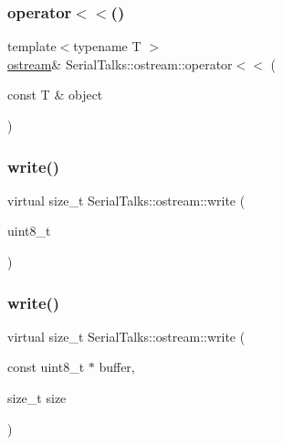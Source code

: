 \subsubsection{\texorpdfstring{operator$<$$<$()}{operator<<()}}
{\footnotesize\ttfamily template$<$typename T $>$ \\
\hyperlink{class_serial_talks_1_1ostream}{ostream}\& Serial\+Talks\+::ostream\+::operator$<$$<$ (\begin{DoxyParamCaption}\item[{const T \&}]{object }\end{DoxyParamCaption})\hspace{0.3cm}{\ttfamily [inline]}}

\mbox{\label{class_serial_talks_1_1ostream_ac36ae84bc51baef57f5ec511884dc48e}} 
\subsubsection{\texorpdfstring{write()}{write()}\hspace{0.1cm}{\footnotesize\ttfamily [1/2]}}
{\footnotesize\ttfamily virtual size\+\_\+t Serial\+Talks\+::ostream\+::write (\begin{DoxyParamCaption}\item[{uint8\+\_\+t}]{ }\end{DoxyParamCaption})\hspace{0.3cm}{\ttfamily [virtual]}}

\mbox{\label{class_serial_talks_1_1ostream_a832eb30e6713d9e2ce2866acbeea0cdc}} 
\subsubsection{\texorpdfstring{write()}{write()}\hspace{0.1cm}{\footnotesize\ttfamily [2/2]}}
{\footnotesize\ttfamily virtual size\+\_\+t Serial\+Talks\+::ostream\+::write (\begin{DoxyParamCaption}\item[{const uint8\+\_\+t $\ast$}]{buffer,  }\item[{size\+\_\+t}]{size }\end{DoxyParamCaption})\hspace{0.3cm}{\ttfamily [virtual]}}



